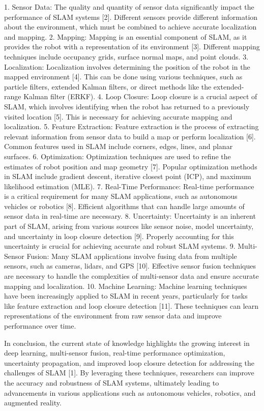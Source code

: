 \documentclass[conference]{IEEEtran}
\begin{document}
1. Sensor Data: The quality and quantity of sensor data significantly impact the performance of SLAM systems [2]. Different sensors provide different information about the environment, which must be combined to achieve accurate localization and mapping.
2. Mapping: Mapping is an essential component of SLAM, as it provides the robot with a representation of its environment [3]. Different mapping techniques include occupancy grids, surface normal maps, and point clouds.
3. Localization: Localization involves determining the position of the robot in the mapped environment [4]. This can be done using various techniques, such as particle filters, extended Kalman filters, or direct methods like the extended-range Kalman filter (ERKF).
4. Loop Closure: Loop closure is a crucial aspect of SLAM, which involves identifying when the robot has returned to a previously visited location [5]. This is necessary for achieving accurate mapping and localization.
5. Feature Extraction: Feature extraction is the process of extracting relevant information from sensor data to build a map or perform localization [6]. Common features used in SLAM include corners, edges, lines, and planar surfaces.
6. Optimization: Optimization techniques are used to refine the estimates of robot position and map geometry [7]. Popular optimization methods in SLAM include gradient descent, iterative closest point (ICP), and maximum likelihood estimation (MLE).
7. Real-Time Performance: Real-time performance is a critical requirement for many SLAM applications, such as autonomous vehicles or robotics [8]. Efficient algorithms that can handle large amounts of sensor data in real-time are necessary.
8. Uncertainty: Uncertainty is an inherent part of SLAM, arising from various sources like sensor noise, model uncertainty, and uncertainty in loop closure detection [9]. Properly accounting for this uncertainty is crucial for achieving accurate and robust SLAM systems.
9. Multi-Sensor Fusion: Many SLAM applications involve fusing data from multiple sensors, such as cameras, lidars, and GPS [10]. Effective sensor fusion techniques are necessary to handle the complexities of multi-sensor data and ensure accurate mapping and localization.
10. Machine Learning: Machine learning techniques have been increasingly applied to SLAM in recent years, particularly for tasks like feature extraction and loop closure detection [11]. These techniques can learn representations of the environment from raw sensor data and improve performance over time.

In conclusion, the current state of knowledge highlights the growing interest in deep learning, multi-sensor fusion, real-time performance optimization, uncertainty propagation, and improved loop closure detection for addressing the challenges of SLAM [1]. By leveraging these techniques, researchers can improve the accuracy and robustness of SLAM systems, ultimately leading to advancements in various applications such as autonomous vehicles, robotics, and augmented reality.
\end{document}
